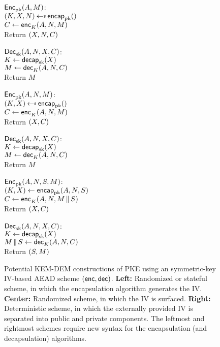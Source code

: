\begin{figure}
\begin{center}
{
\underline{${\mathsf{Enc}}_{\mathrm{pk}}^{}(A, M)$}:\\[2pt]
$(K,\wrap,\pubiv) \getsr \encap_\pk()$\\
$C \gets {\mathsf{enc}}_{K}^{}(A,N,M)$\\
Return $(X,N,C)$

\medskip
\underline{${\mathsf{Dec}}_{\mathrm{sk}}^{}(A,N,X,C)$}:\\[2pt]
$K \gets \mathsf{decap}_{\mathrm{sk}}(X)$\\
$M \gets {\mathsf{dec}}_{K}^{}(A,N,C)$\\
Return $M$
}
{
\underline{${\mathsf{Enc}}_{\mathrm{pk}}^{}(A,N,M)$}:\\[2pt]
$(K,\wrap) \getsr \encap_\pk()$\\
$C \gets {\mathsf{enc}}_{K}^{}(A,N,M)$\\
Return $(X,C)$

\medskip
\underline{${\mathsf{Dec}}_{\mathrm{sk}}^{}(A,N,X,C)$}:\\[2pt]
$K \gets \mathsf{decap}_{\mathrm{sk}}(X)$\\
$M \gets {\mathsf{dec}}_{K}^{}(A,N,C)$\\
Return $M$

}
{
\underline{${\mathsf{Enc}}_{\mathrm{pk}}^{}(A,N,S,M)$}:\\[2pt]
$(K,X) \gets \mathsf{encap}_{\mathrm{pk}}(A,N,S)$\\
$C \gets {\mathsf{enc}}_{K}^{}(A,N,M \,\|\, S)$\\
Return $(X,C)$

\medskip
\underline{${\mathsf{Dec}}_{\mathrm{sk}}^{}(A,N,X,C)$}:\\[2pt]
$K \gets \mathsf{decap}_{\mathrm{sk}}(X)$\\
$M \,\|\, S \gets {\mathsf{dec}}_{K}^{}(A,N,C)$\\
Return $(S,M)$
}
\caption{Potential KEM-DEM constructions of PKE using an symmetric-key IV-based AEAD scheme $({\mathsf{enc}},{\mathsf{dec}})$. \textbf{Left:} Randomized or stateful scheme, in which the encapsulation algorithm generates the IV.  \textbf{Center:} Randomized scheme, in which the IV is surfaced.  \textbf{Right:} Deterministic scheme, in which the externally provided IV is separated into public and private components. The leftmost and rightmost schemes require new syntax for the encapsulation (and decapsulation) algorithms.}
\label{fig:kem-dem options}
\end{center}
\end{figure}


